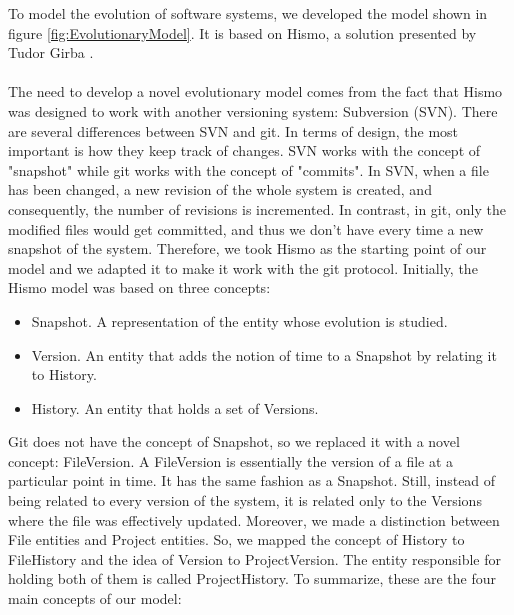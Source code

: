 To model the evolution of software systems, we developed the model 
shown in figure \ref{fig:EvolutionaryModel}. It is based on Hismo, a solution presented by Tudor Girba \cite{Girba2005}.\\
\\
The need to develop a novel evolutionary model comes from the fact that Hismo was designed to work with another versioning system: Subversion (SVN). 
There are several differences between SVN and git. In terms of design, the most important is how they keep track of changes. 
SVN works with the concept of "snapshot" while git works with the concept of "commits".
In SVN, when a file has been changed, a new revision of the whole system is created, and consequently, the number of revisions is incremented. 
In contrast, in git, only the modified files would get committed, and thus we don't have every time a new snapshot of the system. 
Therefore, we took Hismo as the starting point of our model and we adapted it to make it work with the git protocol. 
Initially, the Hismo model was based on three concepts:
\begin{itemize}
    \item Snapshot. A representation of the entity whose evolution is studied.
    \item Version. An entity that adds the notion of time to a Snapshot by relating it to History. 
    \item History. An entity that holds a set of Versions.
\end{itemize}
\bigbreak
Git does not have the concept of Snapshot, so we replaced it with a novel concept: FileVersion. 
A FileVersion is essentially the version of a file at a particular point in time. 
It has the same fashion as a Snapshot. Still, instead of being related to every version of the system, it is related only to the Versions where the file was effectively updated.
Moreover, we made a distinction between File entities and Project entities. So, we mapped the concept of History to FileHistory and the idea of Version to ProjectVersion. 
The entity responsible for holding both of them is called ProjectHistory. 
To summarize, these are the four main concepts of our model: 
